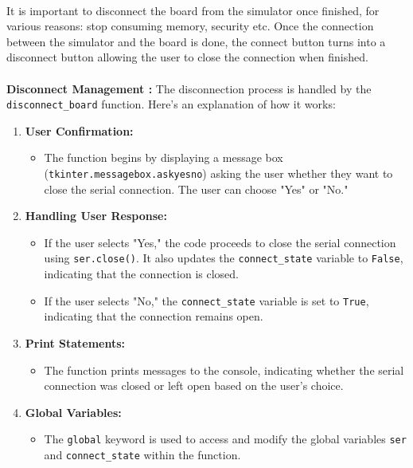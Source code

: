\documentclass{article}
\begin{document}
\paragraph{}It is important to disconnect the board from the simulator once finished, for various reasons: stop consuming memory, security etc. Once the connection between the simulator and the board is done, the connect button turns into a disconnect button allowing the user to close the connection when finished.
 
\paragraph{}\textbf{Disconnect Management :}
The disconnection process is handled by the \texttt{disconnect\_board} function. Here's an explanation of how it works:
\begin{enumerate}
    \item \textbf{User Confirmation:}
    \begin{itemize}
        \item The function begins by displaying a message box (\texttt{tkinter.messagebox.askyesno}) asking the user whether they want to close the serial connection. The user can choose "Yes" or "No."
    \end{itemize}
    
    \item \textbf{Handling User Response:}
    \begin{itemize}
        \item If the user selects "Yes," the code proceeds to close the serial connection using \texttt{ser.close()}. It also updates the \texttt{connect\_state} variable to \texttt{False}, indicating that the connection is closed.
        \item If the user selects "No," the \texttt{connect\_state} variable is set to \texttt{True}, indicating that the connection remains open.
    \end{itemize}
    
    \item \textbf{Print Statements:}
    \begin{itemize}
        \item The function prints messages to the console, indicating whether the serial connection was closed or left open based on the user's choice.
    \end{itemize}
    
    \item \textbf{Global Variables:}
    \begin{itemize}
        \item The \texttt{global} keyword is used to access and modify the global variables \texttt{ser} and \texttt{connect\_state} within the function.
    \end{itemize}
    

\end{enumerate}
\end{document}
